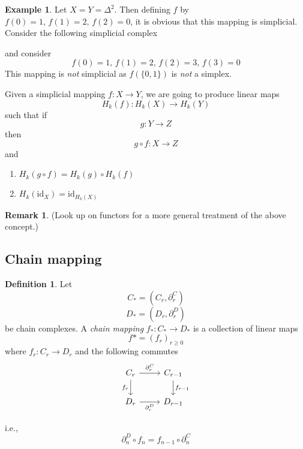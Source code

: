 \documentclass[a4paper,14pt]{extarticle}
\theoremstyle{definition}
\newtheorem*{definition}{Definition}
\newtheorem*{eg}{Example}
\newtheorem*{remark}{Remark}
\begin{document}
\begin{eg}
	Let $X=Y=\Delta^2$. Then defining $f$ by $f(0)=1,\,f(1)=2, \,f(2)=0$, it is obvious that this mapping is simplicial. \\

	Consider the following simplicial complex
	\begin{center}
	\end{center}
	and consider \[f(0)=1,\,f(1)=2,\,f(2)=3,\,f(3)=0\] This mapping is \emph{not} simplicial as $f(\{0,1\})$ is \emph{not} a simplex.
\end{eg}

Given a simplicial mapping $f:X\rightarrow Y$, we are going to produce linear maps \[H_k(f):H_k(X)\rightarrow H_k(Y)\] such that if \[g:Y\rightarrow Z\] then \[g\circ f:X\rightarrow Z\] and
\begin{enumerate}
	\item $H_k(g\circ f)=H_k(g)\circ H_k(f)$
	\item $H_k(\text{id}_X)=\text{id}_{H_k(X)}$
\end{enumerate}

\begin{remark}
	(Look up on functors for a more general treatment
	of the above concept.)
\end{remark}

\subsection{Chain mapping}
\begin{definition}
	Let \[C_*=(C_r,\partial_r^C)\]\[D_*=(D_r,\partial_r^D)\] be chain complexes. A \emph{chain mapping} $f_*:C_*\rightarrow D_*$ is a collection of linear maps \[f*=(f_r)_{r\geq0}\] where
	$f_r:C_r\rightarrow D_r$ and the following commutes
	\[
	\begin{tikzcd}
	C_r \arrow{r}{\partial_r^C} \arrow[swap]{d}{f_r} & C_{r-1} \arrow{d}{f_{r-1}} \\
	D_r\arrow[swap]{r}{\partial_r^D} & D_{r-1}
	\end{tikzcd}
	\]	
\end{definition}

i.e., \[\partial_n^D\circ f_n=f_{n-1}\circ\partial_n^C\]
\end{document}
